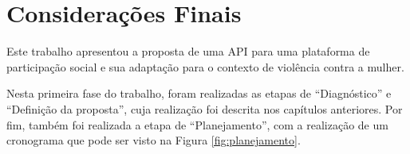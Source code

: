 \chapter{Considerações Finais} \label{cap:consideracoes_finais}

Este trabalho apresentou a proposta de uma API para uma plataforma de
participação social e sua adaptação para o contexto de violência contra a mulher.

% 

Nesta primeira fase do trabalho, foram realizadas as etapas de ``Diagnóstico'' e ``Definição da proposta'', cuja realização foi descrita nos capítulos anteriores. 
Por fim, também foi realizada a etapa de ``Planejamento'', com a realização de um cronograma que pode ser visto na Figura \ref{fig:planejamento}.


